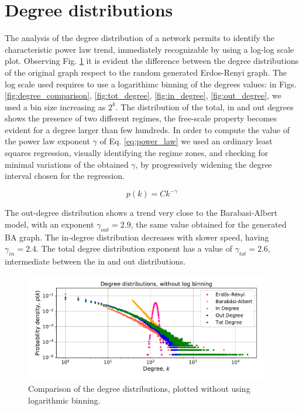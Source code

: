 \documentclass[11pt, twoside]{report}
\begin{document}
    \section{Degree distributions}
    The analysis of the degree distribution of a network permits to identify the characteristic power law trend, immediately recognizable
    by using a log-log scale plot. Observing Fig. \ref{fig:degree_nolog} it is evident the difference between the degree distributions of the original graph respect to the random generated Erdos-Renyi graph.
    The log scale used requires to use a logarithimc binning of the degrees values: in Figs. \ref{fig:degree_comparison}, \ref{fig:tot_degree}, \ref{fig:in_degree}, \ref{fig:out_degree}, we used a bin size increasing as $2^k$.
    The distribution of the total, in and out degrees shows the presence of two different regimes, the free-scale property becomes evident
    for a degree larger than few hundreds. In order to compute the value of the power law exponent $\gamma$ of Eq. \ref{eq:power_law} we used an ordinary least squares regression, visually identifying the regime zones, and checking for minimal variations of the obtained $\gamma$, by progressively widening the degree interval chosen for the regression.

    \begin{equation}
      p(k) = C k^{-\gamma}
      \label{eq:power_law}
    \end{equation}

    The out-degree distribution shows a trend very close to the Barabasi-Albert model, with an exponent $\gamma_{out} = 2.9$, the same value obtained for the generated BA graph. The in-degree distribution decreases with slower speed, having $\gamma_{in} = 2.4$. The total degree distribution exponent has a value of $\gamma_{tot} = 2.6$, intermediate between the in and out distributions.
 

 \begin{figure}[hb]
      \centering
      \includegraphics[width=0.95\textwidth]{../../scripts/network_analysis/imgs/degree_distributions_nobinlog.pdf}            
      \caption{Comparison of the degree distributions, plotted without using logarithmic binning.}
      \label{fig:degree_nolog}
    \end{figure}
\end{document}
